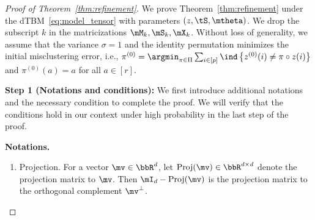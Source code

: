 \documentclass[lettersize,onecolumn,journal]{IEEEtran}
\theoremstyle{definition}
\theoremstyle{definition}
\newcommand{\offf}[1]{\left\{#1\right\}}
\begin{document}
\begin{proof}[Proof of Theorem~\ref{thm:refinement}]
We prove Theorem~\ref{thm:refinement} under the dTBM~\eqref{eq:model_tensor} with parameters $(z, \tS, \mtheta)$. We drop the subscript $k$ in the matricizations $\mM_k, \mS_k, \mX_k$. Without loss of generality, we assume that the variance $\sigma = 1$ and the identity permutation minimizes the initial misclustering error, i.e., $\pi^{(0)} = \argmin_{\pi \in \Pi} \sum_{i \in [p]}\ind \offf{z^{(0)}(i) \neq \pi \circ z(i) }$ and $\pi^{(0)}(a) = a$ for all $ a \in [r]$.



{\bf Step 1 (Notations and conditions):} We first introduce additional notations and the necessary condition to complete the proof. We will verify that the conditions hold in our context under high probability in the last step of the proof. 

\textbf{Notations.}
\begin{enumerate}

\item Projection. For a vector $\mv \in \bbR^d$, let $\text{Proj}(\mv) \in \bbR^{d \times d}$ denote the projection matrix to $\mv$. Then $\mI_d - \text{Proj}(\mv)$ is the projection matrix to the orthogonal complement $\mv^{\perp}$. 


\end{enumerate}
\end{proof}
\end{document}
